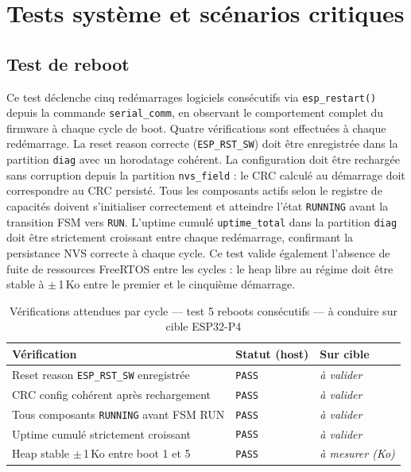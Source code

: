 \section{Tests système et scénarios critiques}
\label{sec:sys_tests}

\subsection{Test de reboot}
\label{subsec:t_reboot}

Ce test déclenche cinq redémarrages logiciels consécutifs via
\texttt{esp\_restart()} depuis la commande \texttt{serial\_comm},
en observant le comportement complet du firmware à chaque cycle de
boot. Quatre vérifications sont effectuées à chaque redémarrage. La
reset reason correcte (\texttt{ESP\_RST\_SW}) doit être enregistrée
dans la partition \texttt{diag} avec un horodatage cohérent. La
configuration doit être rechargée sans corruption depuis la partition
\texttt{nvs\_field} : le CRC calculé au démarrage doit correspondre
au CRC persisté. Tous les composants actifs selon le registre de
capacités doivent s'initialiser correctement et atteindre l'état
\texttt{RUNNING} avant la transition FSM vers \texttt{RUN}. L'uptime
cumulé \texttt{uptime\_total} dans la partition \texttt{diag} doit
être strictement croissant entre chaque redémarrage, confirmant la
persistance NVS correcte à chaque cycle. Ce test valide également
l'absence de fuite de ressources FreeRTOS entre les cycles : le heap
libre au régime doit être stable à $\pm$\,1\,Ko entre le premier et
le cinquième démarrage.

\begin{table}[H]
\centering
\renewcommand{\arraystretch}{1.5}
\caption{Vérifications attendues par cycle — test 5 reboots consécutifs — à conduire sur cible ESP32-P4}
\label{tab:res_reboot}
\small
\begin{tabular}{|p{5.5cm}|p{2.2cm}|p{3.8cm}|}
\hline
\rowcolor{gray!20}
\textbf{Vérification} & \textbf{Statut (host)} & \textbf{Sur cible} \\
\hline
Reset reason \texttt{ESP\_RST\_SW} enregistrée & \texttt{PASS} & \textit{à valider} \\
\hline
CRC config cohérent après rechargement          & \texttt{PASS} & \textit{à valider} \\
\hline
Tous composants \texttt{RUNNING} avant FSM RUN  & \texttt{PASS} & \textit{à valider} \\
\hline
Uptime cumulé strictement croissant             & \texttt{PASS} & \textit{à valider} \\
\hline
Heap stable $\pm$\,1\,Ko entre boot 1 et 5     & \texttt{PASS} & \textit{à mesurer (Ko)} \\
\hline
\end{tabular}
\end{table}

